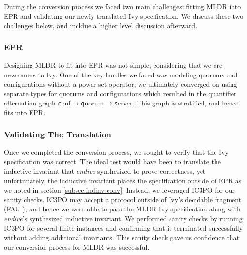 \documentclass[runningheads]{llncs}
\newcommand{\ivy}[1]{{\small\texttt #1}}
\begin{document}
During the conversion process we faced two main challenges: fitting MLDR into EPR and validating our newly translated Ivy specification.  We discuss these two challenges below, and incldue a higher level discussion afterward.

\subsubsection{EPR}
\label{sec:mldr-epr}



Designing MLDR to fit into EPR was not simple, considering that we are newcomers to Ivy.  One of the key hurdles we faced was modeling quorums and configurations without a power set operator; we ultimately converged on using separate types for quorums and configurations which resulted in the quantifier alternation graph \ivy{conf}$\to$\ivy{quorum}$\to$\ivy{server}.  This graph is stratified, and hence fits into EPR.  

\subsubsection{Validating The Translation}


Once we completed the conversion process, we sought to verify that the Ivy specification was correct.  The ideal test would have been to translate the inductive invariant that \textit{endive} synthesized to prove correctness, yet unfortunately, the inductive invariant places the specification outside of EPR as we noted in section \ref{subsec:indinv-conv}.  Instead, we leveraged IC3PO for our sanity checks.  IC3PO may accept a protocol outside of Ivy's decidable fragment (FAU \cite{Ge2009Complete}), and hence we were able to pass the MLDR Ivy specification along with \textit{endive}'s synthesized inductive invariant.  We performed sanity checks by running IC3PO for several finite instances and confirming that it terminated successfully without adding additional invariants.  This sanity check gave us confidence that our conversion process for MLDR was successful.
\end{document}
